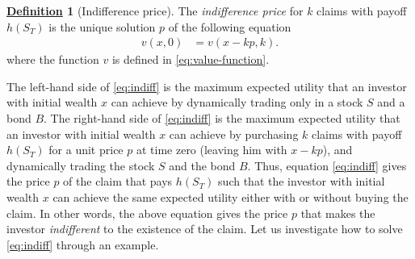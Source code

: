 \documentclass[12pt]{book}
\numberwithin{equation}{chapter}
\theoremstyle{plain}
\numberwithin{theorem}{section}
\theoremstyle{definition}
\newtheorem{definition}[theorem]{\underline{Definition}}
\numberwithin{exercise}{chapter}
\newcommand{\<}{\langle}
\renewcommand{\>}{\rangle}
\renewcommand{\(}{\left(}
\renewcommand{\)}{\right)}
\renewcommand{\[}{\left[}
\renewcommand{\]}{\right]}
\theoremstyle{definition}
\numberwithin{question}{section}
\begin{document}
\begin{definition}[Indifference price]
The \textit{indifference price} for $k$ claims with payoff $h(S_T)$ is the unique solution $p$ of the following equation
\begin{align}
v(x,0)
		&= v(x-k p, k) .  \label{eq:indiff}
\end{align}
where the function $v$ is defined in \eqref{eq:value-function}.
\end{definition}

\noindent
The left-hand side of \eqref{eq:indiff} is the maximum expected utility that an investor with initial wealth $x$ can achieve by dynamically trading only in a stock $S$ and a bond $B$.  The right-hand side of \eqref{eq:indiff} is the maximum expected utility that an investor with initial wealth $x$ can achieve by purchasing $k$ claims with payoff $h(S_T)$ for a unit price $p$ at time zero (leaving him with $x- k p$), and dynamically trading the stock $S$ and the bond $B$.
Thus, equation \eqref{eq:indiff} gives the price $p$ of the claim that pays $h(S_T)$ such that the investor with initial wealth $x$ can achieve the same expected utility either with or without buying the claim.  In other words, the above equation gives the price $p$ that makes the investor \textit{indifferent} to the existence of the claim.  Let us investigate how to solve \eqref{eq:indiff} through an example. 
\end{document}
